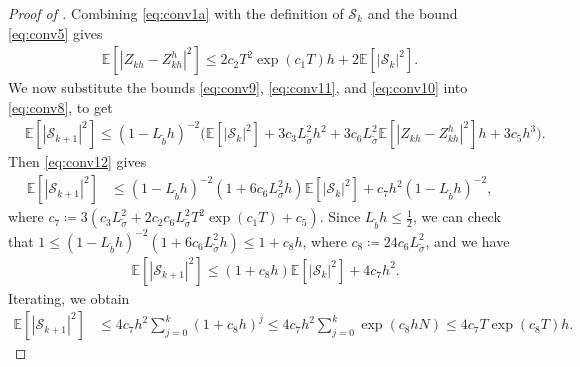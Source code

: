 \documentclass[onseside, final]{amsart}
\theoremstyle{definition}
\newcommand{\E}{\mathbb E}
\numberwithin{equation}{section}
\begin{document}
\begin{proof}[Proof of ]
			Combining \eqref{eq:conv1a} with the definition of $\mathcal S_k$ and the bound \eqref{eq:conv5} gives
			\begin{equation}\label{eq:conv12}
				\begin{aligned}
					\E[|Z_{kh} -Z^h_{kh}|^{2}]\le 2 c_2T^2\exp(c_1T) h + 2 \mathbb{E} [|\mathcal S_{k}|^2].
				\end{aligned}
			\end{equation}
			We now substitute the bounds \eqref{eq:conv9}, \eqref{eq:conv11}, and \eqref{eq:conv10} into \eqref{eq:conv8}, to get
			\begin{equation}
				\begin{aligned}
					&\mathbb{E} [|\mathcal S_{k+1}|^2] \le
					(1-L_{\tilde b}h)^{-{2}}\bigl(\mathbb{E}[| \mathcal S_k|^2] + 3c_3L_{\tilde \sigma}^{2} h^2 + 3c_6 L_{\tilde \sigma}^{2}  \mathbb{E}[|Z_{kh}-Z^h_{kh}|^{2}]  h +  3c_5  h^3\bigr).
				\end{aligned}
			\end{equation}
			Then \eqref{eq:conv12} gives
			\begin{equation}\label{eq:conv13}
				\begin{aligned}
					\mathbb{E} [|\mathcal S_{k+1}|^{2}] & \le
					(1-L_{\tilde b}h)^{-{2}} (1+6c_6 L_{\tilde \sigma}^{2}  h)\mathbb{E}[| \mathcal S_k|^2] + c_7 h^2 (1-L_{\tilde b}h)^{-{2}},
				\end{aligned}
			\end{equation}
			where $c_7 \coloneqq 3(c_3 L_{\tilde \sigma}^2 + 2c_2c_6 L_{\tilde \sigma}^{2}  T^2\exp(c_1T) + c_5)$.
			Since $L_{\tilde b} h \leq \frac12$, we can check that $1 \leq (1-L_{\tilde b}h)^{-{2}} (1+6c_6 L_{\tilde \sigma}^{2}  h) \leq 1 + c_8 h$, where $c_8 \coloneqq 24 c_6L_{\tilde \sigma}^2$, and we have
			\begin{equation}\label{eq:conv14}
				\begin{aligned}
					&\mathbb{E} [|\mathcal S_{k+1}|^{2}] \le
					(1 + c_8 h)\mathbb{E}[| \mathcal S_k|^2] + 4 c_7 h^2.
				\end{aligned}
			\end{equation}
			Iterating, we obtain
			\begin{equation}
				\begin{aligned}
					\mathbb{E} [|\mathcal S_{k + 1}|^2]
					&\le
					4 c_7 h^2 \sum_{j=0}^{k}(1+c_8 h)^j
					\le
					4 c_7 h^2 \sum_{j=0}^{k}\exp(c_8 h N)
					\le	4 c_7 T \exp(c_8 T) h.
				\end{aligned}
			\end{equation}

\end{proof}
\end{document}
